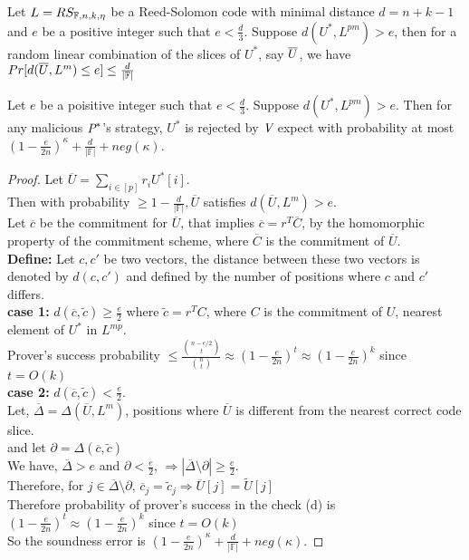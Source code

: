  \begin{lemma}
 	Let $L=RS_{\bbF,n,k,\eta}$ be a Reed-Solomon code with minimal distance $d=n+k-1$ and $e$ be a positive integer such that $e<\frac{d}{3}$. Suppose $d(U^*, L^{pm})> e$, then for a random linear combination of the slices of $U^*$, say $\oU$, we have $Pr[d(\oU,L^m)\leq e]\leq \frac{d}{|\bbF|}$
 \end{lemma}

 \begin{lemma} Let $e$ be a poisitive integer such that $e<\frac{d}{3}$. Suppose $d(U^*,L^{pm})>e$. Then for any malicious $\P^*$'s strategy, $U^*$ is rejected by $\V$ expect with probability at most $(1-\frac{e}{2n})^{\kappa}+\frac{d}{|\mathbb{F}|}+neg(\kappa)$.
 \end{lemma}
 
 \begin{proof}
 	Let $\overline{U}= \sum\limits_{i\in[p]}r_iU^{*}[i]$.\\
	Then with probability $\geq 1-\frac{d}{|\mathbb{F}|}, \overline{U}$ satisfies $d(\overline{U},L^m)>e$.\\
	Let $\overline{c}$ be the commitment for $\overline{U}$, that implies $\overline{c}=r^T\overline{C}$, by the homomorphic property of the commitment scheme, where $\overline{C}$ is the commitment of $\overline{U}$.\\
	\textbf{Define: } Let $c,c'$ be two vectors, the distance between these two vectors is denoted by $d(c,c')$ and defined by the number of positions where $c$ and $c'$ differs.\\
	\textbf{case 1:} $d(\overline{c},\tilde{c})\geq \frac{e}{2}$ where $\tilde{c}= r^TC$, where $C$ is the commitment of $U$, nearest element of $U^*$ in $L^{mp}$.\\
	Prover's success probability $\leq \frac{\binom{n-e/2}{t}}{\binom{n}{t}}\approx(1-\frac{e}{2n})^t\approx(1-\frac{e}{2n})^k$ since $t=O(k)$\\
	\textbf{case 2:} $d(\overline{c},\tilde{c})< \frac{e}{2}$.\\
	Let, $\overline{\Delta}=\Delta(\overline{U}, L^m)$, positions where $\overline{U}$ is different from the nearest correct code slice.\\
	and let $\partial=\Delta(\overline{c},\tilde{c})$\\
	We have, $\overline{\Delta}>e$ and $\partial<\frac{e}{2}$, 
	$\Rightarrow |\overline{\Delta}\setminus \partial| \geq \frac{e}{2}$.\\
	Therefore, for $j\in \overline{\Delta}\setminus \partial$, $\overline{c}_j=\tilde{c}_j \Rightarrow \overline{U}[j]=\widetilde{U}[j]$\\
	Therefore probability of prover's success in the check (d) is $(1-\frac{e}{2n})^t\approx(1-\frac{e}{2n})^k$ since $t=O(k)$\\
	So the soundness error is $(1-\frac{e}{2n})^{\kappa}+\frac{d}{|\mathbb{F}|}+neg(\kappa)$.
 \end{proof}
 
